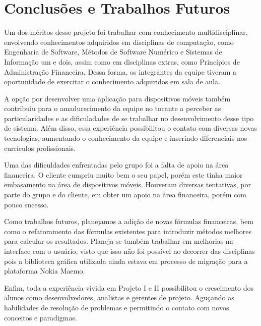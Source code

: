 \chapter{Conclusões e Trabalhos Futuros}

Um dos méritos desse projeto foi trabalhar com conhecimento multidisciplinar, envolvendo 
conhecimentos adquiridos em disciplinas de computação, como Engenharia de Software, Métodos de
Software Numérico e Sistemas de Informação um e dois, assim como em disciplinas extras, como
Princípios de Administração Financeira. Dessa forma, os integrantes da equipe tiveram a
oportunidade de exercitar o conhecimento adquiridos em sala de aula.

A opção por desenvolver uma aplicação para dispositivos móveis também contribuiu para o amadurecimento
da equipe no tocante a perceber as particularidades e as dificuladades de se trabalhar no desenvolvimento desse tipo
de sistema. Além disso, essa experiência possibilitou o contato com diversas novas tecnologias,
aumentando o conhecimento da equipe e inserindo diferenciais nos currículos profissionais.

Uma das dificuldades enfrentadas pelo grupo foi a falta de apoio na área financeira. O cliente
cumpriu muito bem o seu papel, porém este tinha maior embasamento na área de dispositivos móveis.
Houveram diversas tentativas, por parte do grupo e do cliente, em obter um apoio na área financeira,
porém com pouco sucesso.

Como trabalhos futuros, planejamos a adição de novas fórmulas financeiras, bem como o refatoramento
das fórmulas existentes para introduzir métodos melhores para calcular os resultados. Planeja-se
também trabalhar em melhorias na interface com o usuário, visto que isso não foi possível no
decorrer das disciplinas pois a biblioteca gráfica utilizada ainda estava em processo de migração
para a plataforma Nokia Maemo.

Enfim, toda a experiência vivida em Projeto I e II possibilitou o crescimento dos alunos como
desenvolvedores, analistas e gerentes de projeto. Aguçando as habilidades de resolução
de problemas e permitindo o contato com novos conceitos e paradigmas.